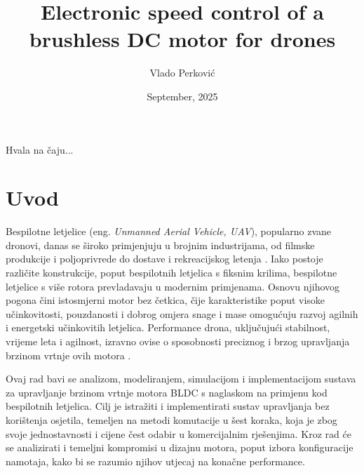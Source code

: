 \documentclass[diplomskirad]{fer}
\title{Electronic speed control of a brushless DC motor for drones}
\author{Vlado Perković}
\date{September, 2025}
\begin{document}
\maketitle




\begin{zahvale}
	Hvala na čaju...
\end{zahvale}

\mainmatter

\tableofcontents
\listoftodos{}
\newpage

\chapter{Uvod}
\label{pog:uvod}

Bespilotne letjelice (eng. \textit{Unmanned Aerial Vehicle, UAV}), popularno
zvane dronovi, danas se široko primjenjuju u brojnim industrijama, od filmske
produkcije i poljoprivrede do dostave i rekreacijskog letenja
\cite{cite:primjena}. Iako postoje različite konstrukcije, poput bespilotnih
letjelica s fiksnim krilima, bespilotne letjelice s više rotora prevladavaju u
modernim primjenama. Osnovu njihovog pogona čini istosmjerni motor bez četkica,
čije karakteristike poput visoke učinkovitosti, pouzdanosti i dobrog omjera
snage i mase omogućuju razvoj agilnih i energetski učinkovitih letjelica.
Performance drona, uključujući stabilnost, vrijeme leta i agilnost, izravno
ovise o sposobnosti preciznog i brzog upravljanja brzinom vrtnje ovih motora
\cite{cite:karakteristike_motora}.

Ovaj rad bavi se analizom, modeliranjem, simulacijom i implementacijom sustava
za upravljanje brzinom vrtnje motora BLDC s naglaskom na primjenu kod
bespilotnih letjelica. Cilj je istražiti i implementirati sustav upravljanja
bez korištenja osjetila, temeljen na metodi komutacije u šest koraka, koja je
zbog svoje jednostavnosti i cijene čest odabir u komercijalnim rješenjima. Kroz
rad će se analizirati i temeljni kompromisi u dizajnu motora, poput izbora
konfiguracije namotaja, kako bi se razumio njihov utjecaj na konačne
performance.
\end{document}
